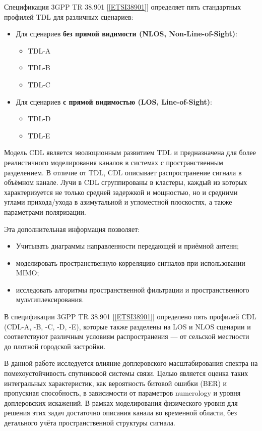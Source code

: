Спецификация 3GPP TR 38.901 [\ref{ETSI38901}] определяет пять стандартных профилей TDL для различных сценариев:
\begin{itemize}
\item Для сценариев \textbf{без прямой видимости (NLOS, Non-Line-of-Sight)}:
\begin{itemize}
\item TDL-A
\item TDL-B
\item TDL-C
\end{itemize}
\item Для сценариев \textbf{с прямой видимостью (LOS, Line-of-Sight)}:
\begin{itemize}
\item TDL-D
\item TDL-E
\end{itemize}
\end{itemize}


Модель CDL является эволюционным развитием TDL и предназначена для более реалистичного
моделирования каналов в системах с пространств\-енным разделением.
В отличие от TDL, CDL описывает распространение сигнала в объёмном канале. 
Лучи в CDL сгруппированы в кластеры, каждый из которых характеризуется не только средней задержкой 
и мощностью, но и средними углами прихода/ухода в азимутальной и угломестной плоскостях,
а также параметрами поляризации.

\newpage
Эта дополнительная информация позволяет:
\begin{itemize}
\item Учитывать диаграммы направленности передающей и приёмной антенн;
\item моделировать пространственную корреляцию сигналов при использовании MIMO;
\item исследовать алгоритмы пространственной фильтрации и пространств\-енного мультиплексирования.
\end{itemize}

В спецификации 3GPP TR 38.901 [\ref{ETSI38901}] определено пять профилей CDL (CDL-A, -B, -C, -D, -E),
которые также разделены на LOS и NLOS сценарии и соответствуют различным условиям распространения 
— от сельской местности до плотной городской застройки.

В данной работе исследуется влияние доплеровского масштабирования спектра на помехоустойчивость
спутниковой системы связи. Целью является оценка таких интегральных характеристик, 
как вероятность битовой ошибки (BER) и пропускная способность, в зависимости от параметров 
numerology и уровня доплеровских искажений. В рамках моделирования физического уровня для решения этих задач 
достаточно описания канала во временной области, без детального учёта пространственной структуры сигнала.

